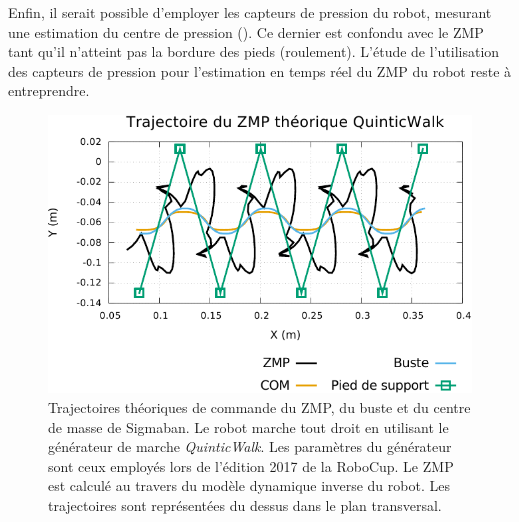Enfin, il serait possible d'employer les capteurs de pression du robot,
mesurant une estimation du centre de pression (\cite{PassaultThesis}).
Ce dernier est confondu avec le ZMP tant qu'il n'atteint pas
la bordure des pieds (roulement).
L'étude de l'utilisation des capteurs de pression pour l'estimation
en temps réel du ZMP du robot reste à entreprendre.\\

\begin{figure}[htb]
    \begin{center}
        \includegraphics[type=pdf,ext=.pdf,read=.pdf,width=1.0\linewidth]{../plot/walk_quintic_zmp}
        \caption{\label{fig:walk_quintic_zmp} 
            Trajectoires théoriques de commande du ZMP, du buste et du centre de masse de Sigmaban.
            Le robot marche tout droit en utilisant le générateur de marche \textit{QuinticWalk}.
            Les paramètres du générateur sont ceux employés lors de l'édition 2017 de la RoboCup.
            Le ZMP est calculé au travers du modèle dynamique inverse du robot.
            Les trajectoires sont représentées du dessus dans le plan transversal.
        }
    \end{center}
\end{figure}

